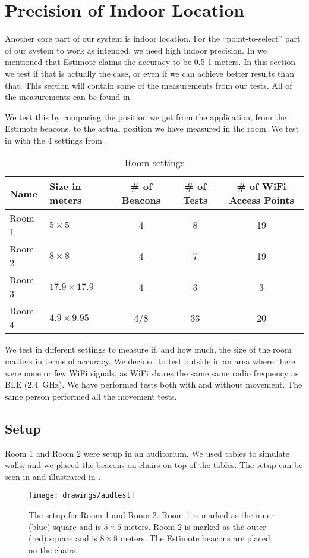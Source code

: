 \section{Precision of Indoor Location}\label{sec:estimoteprecision}
Another core part of our system is indoor location. 
For the ``point-to-select'' part of our system to work as intended, 
we need high indoor precision. 
In  we mentioned that Estimote claims the accuracy to be \num{0.5}-\num{1} meters.
In this section we test if that is actually the case, 
or even if we can achieve better results than that. 
This section will contain some of the measurements from our tests. 
All of the measurements can be found in 

We test this by comparing the position we get from the application, \ie from the Estimote beacons,
to the actual position we have measured in the room. 
We test in with the \num{4} settings from .

\begin{table}
  \centering
  \begin{tabular}{l| l c c c}
    Name & Size in meters & \# of Beacons & \# of Tests & \# of WiFi Access Points\\ \hline
    Room 1 & $5 \times 5$ & 4 & 8 & 19 \\
    Room 2 & $8 \times 8$ & 4 & 7 & 19 \\
    Room 3 & $17.9 \times 17.9$ & 4 & 3 & 3\\
    Room 4 & $4.9 \times 9.95$ & 4/8 & 33 & 20 
  \end{tabular}
  \caption{Room settings}
  \label{table:rooms}
\end{table}

We test in different settings to measure if, and how much, 
the size of the room matters in terms of accuracy. 
We decided to test outside in an area where there were none or few WiFi signals,
as WiFi shares the same same radio frequency as BLE (\SI{2.4}{\GHz}). 
We have performed tests both with and without movement. 
The same person performed all the movement tests. 

\subsection{Setup}\label{sec:setup}
Room 1 and Room 2 were setup in an auditorium. 
We used tables to simulate walls, 
and we placed the beacons on chairs on top of the tables. 
The setup can be seen in  and illustrated in . 
\begin{figure}[!htb]
  \centering
  \texttt{[image: drawings/audtest]}
  \caption{The setup for Room 1 and Room 2. Room 1 is marked as the inner (blue) square and is $5 \times 5$ meters. Room 2 is marked as the outer (red) square and is $8 \times 8$ meters. The Estimote beacons are placed on the chairs.}
  \label{fig:audtest}
\end{figure}

